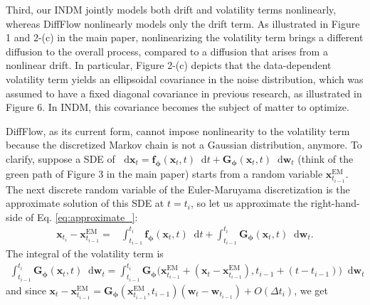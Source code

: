 \documentclass{article}
\theoremstyle{definition}
\theoremstyle{remark}
\newcommand*\diff{\mathop{}\!\mathrm{d}}
\begin{document}
	Third, our INDM jointly models both drift and volatility terms nonlinearly, whereas DiffFlow nonlinearly models only the drift term. As illustrated in Figure 1 and 2-(c) in the main paper, nonlinearizing the volatility term brings a different diffusion to the overall process, compared to a diffusion that arises from a nonlinear drift. In particular, Figure 2-(c) depicts that the data-dependent volatility term yields an ellipsoidal covariance in the noise distribution, which was assumed to have a fixed diagonal covariance in previous research, as illustrated in Figure 6. In INDM, this covariance becomes the subject of matter to optimize.
	
	DiffFlow, as its current form, cannot impose nonlinearity to the volatility term because the discretized Markov chain is not a Gaussian distribution, anymore. To clarify, suppose a SDE of $\diff\mathbf{x}_{t}=\mathbf{f}_{\bm{\phi}}(\mathbf{x}_{t},t)\diff t+\mathbf{G}_{\bm{\phi}}(\mathbf{x}_{t},t)\diff\mathbf{w}_{t}$ (think of the green path of Figure 3 in the main paper) starts from a random variable $\mathbf{x}_{t_{i-1}}^{\text{EM}}$. The next discrete random variable of the Euler-Maruyama discretization is the approximate solution of this SDE at $t=t_{i}$, so let us approximate the right-hand-side of Eq. \eqref{eq:approximate_}:
	\begin{align}\label{eq:approximate_}
	\mathbf{x}_{t_{i}}-\mathbf{x}_{t_{i-1}}^{\text{EM}}=&\int_{t_{i-1}}^{t_{i}}\mathbf{f}_{\bm{\phi}}(\mathbf{x}_{t},t)\diff t+\int_{t_{i-1}}^{t_{i}}\mathbf{G}_{\bm{\phi}}(\mathbf{x}_{t},t)\diff\mathbf{w}_{t}.
	\end{align}
	The integral of the volatility term is
	\begin{align*}
	\int_{t_{i-1}}^{t_{i}}\mathbf{G}_{\bm{\phi}}(\mathbf{x}_{t},t)\diff\mathbf{w}_{t}=\int_{t_{i-1}}^{t_{i}}\mathbf{G}_{\bm{\phi}}\big(\mathbf{x}_{t_{i-1}}^{\text{EM}}+(\mathbf{x}_{t}-\mathbf{x}_{t_{i-1}}^{\text{EM}}),t_{i-1}+(t-t_{i-1})\big)\diff\mathbf{w}_{t}
	\end{align*}
	and since $\mathbf{x}_{t}-\mathbf{x}_{t_{i-1}}^{\text{EM}}=\mathbf{G}_{\bm{\phi}}(\mathbf{x}_{t_{i-1}}^{\text{EM}},t_{i-1})(\mathbf{w}_{t}-\mathbf{w}_{t_{i-1}})+O(\Delta t_{i})$, we get
\end{document}
